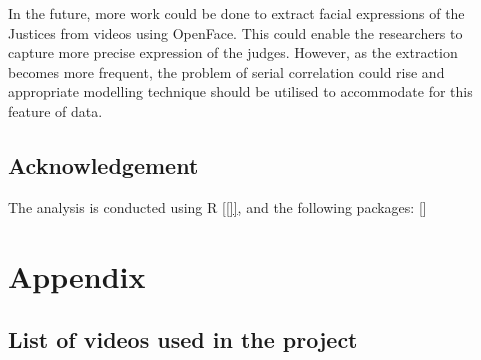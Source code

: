 \documentclass{monashthesis}
\begin{document}
In the future, more work could be done to extract facial expressions of the Justices from videos using OpenFace. This could enable the researchers to capture more precise expression of the judges. However, as the extraction becomes more frequent, the problem of serial correlation could rise and appropriate modelling technique should be utilised to accommodate for this feature of data.

\hypertarget{acknowledgement}{%
\section{Acknowledgement}\label{acknowledgement}}

The analysis is conducted using R {[}\ref{]}, and the following packages: {[}{]}

\appendix

\hypertarget{appendix}{%
\chapter{Appendix}\label{appendix}}

\hypertarget{list-of-videos-used-in-the-project}{%
\section{List of videos used in the project}\label{list-of-videos-used-in-the-project}}
\end{document}
